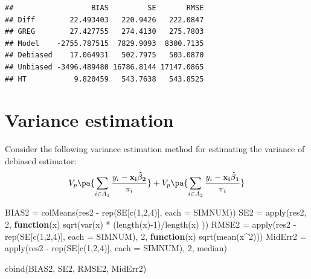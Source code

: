 \documentclass[
]{article}
\newenvironment{Shaded}{\begin{snugshade}}{\end{snugshade}}
\newcommand{\AttributeTok}[1]{\textcolor[rgb]{0.77,0.63,0.00}{#1}}
\newcommand{\ControlFlowTok}[1]{\textcolor[rgb]{0.13,0.29,0.53}{\textbf{#1}}}
\newcommand{\DecValTok}[1]{\textcolor[rgb]{0.00,0.00,0.81}{#1}}
\newcommand{\FunctionTok}[1]{\textcolor[rgb]{0.00,0.00,0.00}{#1}}
\newcommand{\NormalTok}[1]{#1}
\newcommand{\OtherTok}[1]{\textcolor[rgb]{0.56,0.35,0.01}{#1}}
\newcommand{\SpecialCharTok}[1]{\textcolor[rgb]{0.00,0.00,0.00}{#1}}
\begin{document}
\begin{verbatim}
##                  BIAS         SE       RMSE
## Diff        22.493403   220.9426   222.0847
## GREG        27.427755   274.4130   275.7803
## Model    -2755.787515  7829.9093  8300.7135
## Debiased    17.064931   502.7975   503.0870
## Unbiased -3496.489480 16786.8144 17147.0865
## HT           9.820459   543.7638   543.8525
\end{verbatim}

\hypertarget{variance-estimation}{%
\section{Variance estimation}\label{variance-estimation}}

Consider the following variance estimation method for estimating the
variance of debiased estimator: \[
V_p\pa{\sum_{i \in A_1}\frac{y_i - \bf x_i \hat {\bf \beta}_2}{\pi_i}} + V_p\pa{\sum_{i \in A_2}\frac{y_i - \bf x_i \hat {\bf \beta}_1}{\pi_i}}
\]

\begin{Shaded}
\begin{Highlighting}[]
\NormalTok{BIAS2 }\OtherTok{=} \FunctionTok{colMeans}\NormalTok{(res2 }\SpecialCharTok{{-}} \FunctionTok{rep}\NormalTok{(SE[}\FunctionTok{c}\NormalTok{(}\DecValTok{1}\NormalTok{,}\DecValTok{2}\NormalTok{,}\DecValTok{4}\NormalTok{)], }\AttributeTok{each =}\NormalTok{ SIMNUM))}
\NormalTok{SE2 }\OtherTok{=} \FunctionTok{apply}\NormalTok{(res2, }\DecValTok{2}\NormalTok{, }\ControlFlowTok{function}\NormalTok{(x) }\FunctionTok{sqrt}\NormalTok{(}\FunctionTok{var}\NormalTok{(x) }\SpecialCharTok{*}\NormalTok{ (}\FunctionTok{length}\NormalTok{(x)}\SpecialCharTok{{-}}\DecValTok{1}\NormalTok{)}\SpecialCharTok{/}\FunctionTok{length}\NormalTok{(x) ))}
\NormalTok{RMSE2 }\OtherTok{=} \FunctionTok{apply}\NormalTok{(res2 }\SpecialCharTok{{-}} \FunctionTok{rep}\NormalTok{(SE[}\FunctionTok{c}\NormalTok{(}\DecValTok{1}\NormalTok{,}\DecValTok{2}\NormalTok{,}\DecValTok{4}\NormalTok{)], }\AttributeTok{each =}\NormalTok{ SIMNUM), }\DecValTok{2}\NormalTok{, }\ControlFlowTok{function}\NormalTok{(x) }\FunctionTok{sqrt}\NormalTok{(}\FunctionTok{mean}\NormalTok{(x}\SpecialCharTok{\^{}}\DecValTok{2}\NormalTok{)))}
\NormalTok{MidErr2 }\OtherTok{=} \FunctionTok{apply}\NormalTok{(res2 }\SpecialCharTok{{-}} \FunctionTok{rep}\NormalTok{(SE[}\FunctionTok{c}\NormalTok{(}\DecValTok{1}\NormalTok{,}\DecValTok{2}\NormalTok{,}\DecValTok{4}\NormalTok{)], }\AttributeTok{each =}\NormalTok{ SIMNUM), }\DecValTok{2}\NormalTok{, median)}

\FunctionTok{cbind}\NormalTok{(BIAS2, SE2, RMSE2, MidErr2)}
\end{Highlighting}
\end{Shaded}
\end{document}
